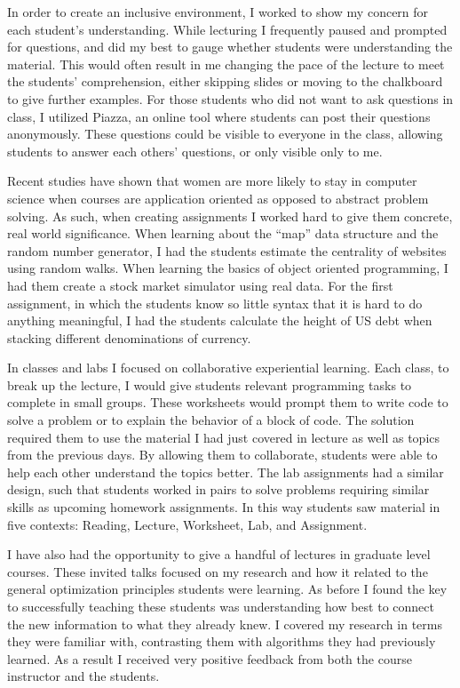 \documentclass[a4paper, 11pt]{article}
\begin{document}
In order to create an inclusive environment, I worked to
show my concern for each student's understanding. While
lecturing I frequently paused and prompted for questions,
and did my best to gauge whether students were understanding
the material. This would often result in me changing the pace
of the lecture to meet the students' comprehension, either
skipping slides or moving to the chalkboard to give further
examples. For those students who did not want to ask questions
in class, I utilized Piazza, an online tool where students
can post their questions anonymously. These questions could be
visible to everyone in the class, allowing students to answer
each others' questions, or only visible only to me. 

Recent studies have shown that women are more likely to stay
in computer science when courses are application oriented
as opposed to abstract problem solving. As such, when creating
assignments I worked hard to give them concrete,
real world significance. When learning about the ``map'' data
structure and the random number generator, I had the students
estimate the centrality of websites using random walks.
When learning the basics of object oriented programming,
I had them create a stock market simulator using real data.
For the first assignment, in which the students know so little
syntax that it is hard to do anything meaningful, I had the
students calculate the height of US debt when stacking different denominations of currency.

In classes and labs I focused on collaborative experiential learning.
Each class, to break up the lecture, I would give students
relevant programming tasks to complete in small groups.
These worksheets would prompt them to write code to solve a
problem or to explain the behavior of a block of code. The solution
required them to use the material I had just covered in lecture as
well as topics from the previous days. By allowing them to collaborate,
students were able to help each other understand the topics better.
The lab assignments had a similar design, such that students worked
in pairs to solve problems requiring similar skills as upcoming
homework assignments. In this way students saw material in five
contexts: Reading, Lecture, Worksheet, Lab, and Assignment.

I have also had the opportunity to give a handful of lectures in graduate level courses.
These invited talks focused on my research and how it related
to the general optimization principles students were learning.
As before I found the key to successfully teaching these students
was understanding how best to connect the new information to
what they already knew. I covered my research in terms they
were familiar with, contrasting them with algorithms they had
previously learned. As a result I received very positive
feedback from both the course instructor and the students.
\end{document}

